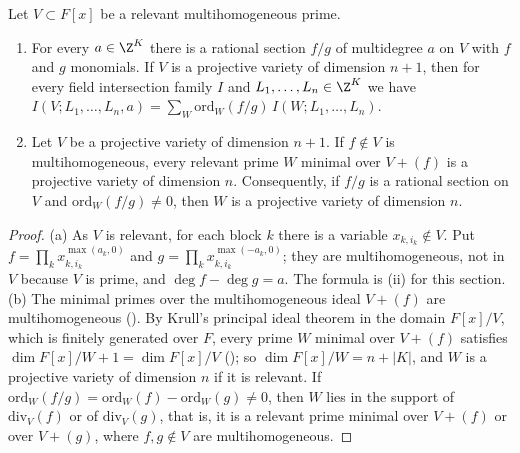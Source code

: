 \begin{lemma}\label{lem:pf:deepstr:stdsec}
Let $V\subset F[x]$ be a relevant multihomogeneous prime.
\begin{enumerate}[label=(\alph*)]
\item For every $a\in\Z^K$ there is a rational section $f/g$ of multidegree $a$ on $V$ with $f$ and $g$ monomials. If
$V$ is a projective variety of dimension $n+1$, then for every field intersection family $I$ and
$L_1,\dots,L_n\in\Z^K$ we have $I(V;L_1,\dots,L_n,a)=\sum_W\mathrm{ord}_W(f/g)\,I(W;L_1,\dots,L_n)$.
\item Let $V$ be a projective variety of dimension $n+1$. If $f\notin V$ is multihomogeneous, every relevant prime
$W$ minimal over $V+(f)$ is a projective variety of dimension $n$. Consequently, if $f/g$ is a rational section on
$V$ and $\mathrm{ord}_W(f/g)\ne0$, then $W$ is a projective variety of dimension $n$.
\end{enumerate}
\end{lemma}

\begin{proof}
(a) As $V$ is relevant, for each block $k$ there is a variable $x_{k,i_k}\notin V$. Put
$f=\prod_kx_{k,i_k}^{\max(a_k,0)}$ and $g=\prod_kx_{k,i_k}^{\max(-a_k,0)}$; they are multihomogeneous, not in $V$ because $V$
is prime, and $\deg f-\deg g=a$. The formula is (ii) for this section.
(b) The minimal primes over the multihomogeneous ideal $V+(f)$ are multihomogeneous
(). By Krull's
principal ideal theorem in the domain $F[x]/V$, which is finitely generated over $F$, every prime $W$ minimal over
$V+(f)$ satisfies $\dim F[x]/W+1=\dim F[x]/V$
(); so $\dim F[x]/W=n+|K|$, and $W$
is a projective variety of dimension $n$ if it is relevant. If $\mathrm{ord}_W(f/g)=\mathrm{ord}_W(f)-\mathrm{ord}_W(g)\ne0$, then $W$
lies in the support of $\mathrm{div}_V(f)$ or of $\mathrm{div}_V(g)$, that is, it is a relevant prime minimal over $V+(f)$ or
over $V+(g)$, where $f,g\notin V$ are multihomogeneous.
\end{proof}

